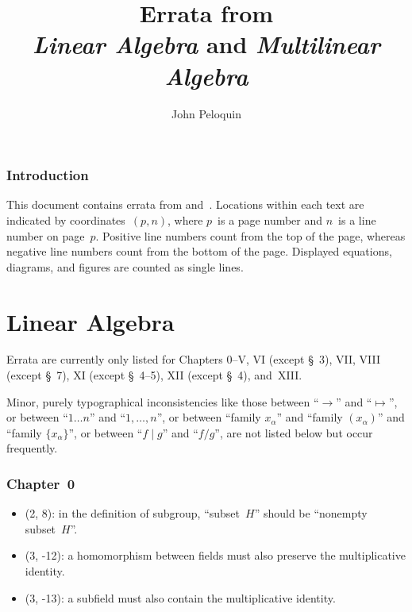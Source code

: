 \documentclass[letterpaper,12pt]{article}
\title{Errata from \\\textit{Linear Algebra} and \textit{Multilinear Algebra}}
\author{John Peloquin}
\date{}
\newcommand{\divides}{\mid}
\begin{document}
\maketitle

\section*{Introduction}
This document contains errata from \cite{greub1} and~\cite{greub2}. Locations within each text are indicated by coordinates~\((p,n)\), where \(p\)~is a page number and \(n\)~is a line number on page~\(p\). Positive line numbers count from the top of the page, whereas negative line numbers count from the bottom of the page. Displayed equations, diagrams, and figures are counted as single lines.

\newpage
\part*{Linear Algebra}
Errata are currently only listed for Chapters 0--V, VI (except \S~3), VII, VIII (except \S~7), XI (except \S~4--5), XII (except \S~4), and~XIII.

Minor, purely typographical inconsistencies like those between ``\(\to\)'' and ``\(\mapsto\)'', or between ``\(1\ldots n\)'' and ``\(1,\ldots,n\)'', or between ``family \(x_{\alpha}\)'' and ``family \((x_{\alpha})\)'' and ``family \(\{x_{\alpha}\}\)'', or between ``\(f\divides g\)'' and ``\(f/g\)'', are not listed below but occur frequently.

\section*{Chapter~0}
\begin{itemize}
\item (2, 8): in the definition of subgroup, ``subset~\(H\)'' should be ``nonempty subset~\(H\)''.
\item (3, -12): a homomorphism between fields must also preserve the multiplicative identity.
\item (3, -13): a subfield must also contain the multiplicative identity.
\end{itemize}
\end{document}
